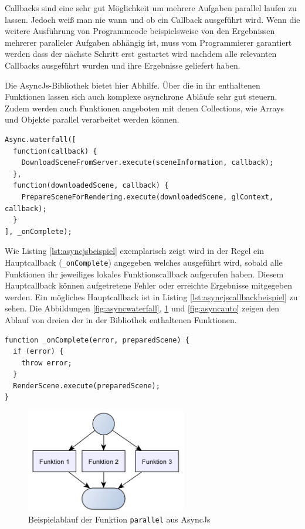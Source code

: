 Callbacks sind eine sehr gut Möglichkeit um mehrere Aufgaben parallel laufen zu lassen. Jedoch weiß man nie wann und ob ein Callback ausgeführt wird. Wenn die weitere Ausführung von Programmcode beispielsweise von den Ergebnissen mehrerer paralleler Aufgaben abhängig ist, muss vom Programmierer garantiert werden dass der nächste Schritt erst gestartet wird nachdem alle relevanten Callbacks ausgeführt wurden und ihre Ergebnisse geliefert haben.

Die AsyncJs-Bibliothek bietet hier Abhilfe. Über die in ihr enthaltenen Funktionen lassen sich auch komplexe asynchrone Abläufe sehr gut steuern. Zudem werden auch Funktionen angeboten mit denen Collections, wie Arrays und Objekte parallel verarbeitet werden können.
\lstset{language=JavaScript}
\begin{lstlisting}[caption={Beispiel für einen Aufruf von AsyncJs}, label={lst:asyncjsbeispiel}]
Async.waterfall([
  function(callback) {
    DownloadSceneFromServer.execute(sceneInformation, callback);
  },
  function(downloadedScene, callback) {
    PrepareSceneForRendering.execute(downloadedScene, glContext, callback);
  }
], _onComplete);
\end{lstlisting}
Wie Listing \ref{lst:asyncjsbeispiel} exemplarisch zeigt wird in der Regel ein Hauptcallback (\texttt{\_onComplete}) angegeben welches ausgeführt wird, sobald alle Funktionen ihr jeweiliges lokales Funktionscallback aufgerufen haben. Diesem Hauptcallback können aufgetretene Fehler oder erreichte Ergebnisse mitgegeben werden. Ein mögliches Hauptcallback ist in Listing \ref{lst:asyncjscallbackbeispiel} zu sehen. Die Abbildungen \ref{fig:asyncwaterfall}, \ref{fig:asyncparallel} und \ref{fig:asyncauto} zeigen den Ablauf von dreien der in der Bibliothek enthaltenen Funktionen.
\lstset{language=JavaScript}
\begin{lstlisting}[caption={Beispiel eines Hauptcallback für Listing \ref{lst:asyncjsbeispiel}}, label={lst:asyncjscallbackbeispiel}]
function _onComplete(error, preparedScene) {
  if (error) {
    throw error;
  }
  RenderScene.execute(preparedScene);
}
\end{lstlisting}
\begin{figure}
\centering
\includegraphics[width=70mm]{bilder/asyncparallel.png}
\caption{Beispielablauf der Funktion \texttt{parallel} aus AsyncJs}
\label{fig:asyncparallel}
\end{figure}
